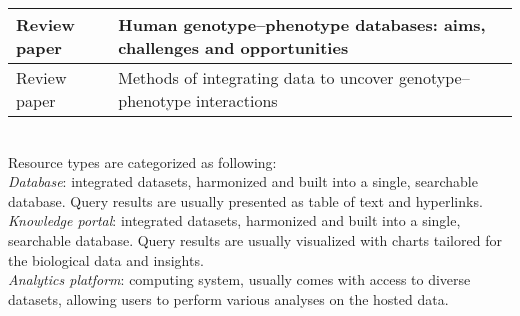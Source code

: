 \documentclass[12pt,letter]{article}
\begin{document}
\begin{landscape}
\begin{table}[]
\begin{tabular}{lp{8cm}ll}
			Review paper       & \multicolumn{2}{l|}{Human genotype–phenotype databases: aims, challenges and opportunities} & \cite{Brookes:2015:Human}             \\ \hline
			Review paper       & \multicolumn{2}{l|}{Methods of integrating data to uncover genotype–phenotype interactions} & \cite{Ritchie:2015:Methods}           \\ \hline
		\end{tabular}	\\ \newline
	\footnotesize{Resource types are categorized as following:\\
\textit{Database}: integrated datasets, harmonized and built into a single, searchable database. Query results are usually presented as table of text and hyperlinks.
\\
\textit{Knowledge portal}: integrated datasets, harmonized and built into a single, searchable database. Query results are usually visualized with charts tailored for the biological data and insights.
\\
\textit{Analytics platform}: computing system, usually comes with access to diverse datasets, allowing users to perform various analyses on the hosted data.	
}
	\end{table}
\end{landscape}



\end{document}
